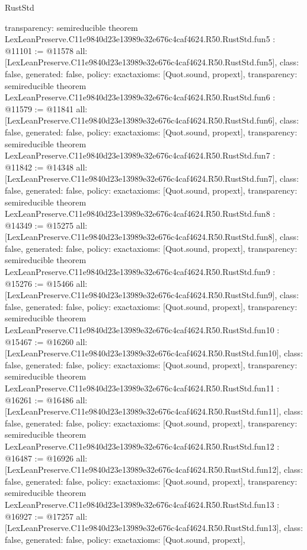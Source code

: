 \begin{lexlean}{RustStd}
\begin{coremodule}
{  transparency: semireducible
}
theorem LexLeanPreserve.C11e9840d23e13989e32e676c4caf4624.R50.RustStd.fun5 : @11101 := @11578 {
  all: [LexLeanPreserve.C11e9840d23e13989e32e676c4caf4624.R50.RustStd.fun5],
  class: false,
  generated: false,
  policy: exact{axioms: [Quot.sound, propext]},
  transparency: semireducible
}
theorem LexLeanPreserve.C11e9840d23e13989e32e676c4caf4624.R50.RustStd.fun6 : @11579 := @11841 {
  all: [LexLeanPreserve.C11e9840d23e13989e32e676c4caf4624.R50.RustStd.fun6],
  class: false,
  generated: false,
  policy: exact{axioms: [Quot.sound, propext]},
  transparency: semireducible
}
theorem LexLeanPreserve.C11e9840d23e13989e32e676c4caf4624.R50.RustStd.fun7 : @11842 := @14348 {
  all: [LexLeanPreserve.C11e9840d23e13989e32e676c4caf4624.R50.RustStd.fun7],
  class: false,
  generated: false,
  policy: exact{axioms: [Quot.sound, propext]},
  transparency: semireducible
}
theorem LexLeanPreserve.C11e9840d23e13989e32e676c4caf4624.R50.RustStd.fun8 : @14349 := @15275 {
  all: [LexLeanPreserve.C11e9840d23e13989e32e676c4caf4624.R50.RustStd.fun8],
  class: false,
  generated: false,
  policy: exact{axioms: [Quot.sound, propext]},
  transparency: semireducible
}
theorem LexLeanPreserve.C11e9840d23e13989e32e676c4caf4624.R50.RustStd.fun9 : @15276 := @15466 {
  all: [LexLeanPreserve.C11e9840d23e13989e32e676c4caf4624.R50.RustStd.fun9],
  class: false,
  generated: false,
  policy: exact{axioms: [Quot.sound, propext]},
  transparency: semireducible
}
theorem LexLeanPreserve.C11e9840d23e13989e32e676c4caf4624.R50.RustStd.fun10 : @15467 := @16260 {
  all: [LexLeanPreserve.C11e9840d23e13989e32e676c4caf4624.R50.RustStd.fun10],
  class: false,
  generated: false,
  policy: exact{axioms: [Quot.sound, propext]},
  transparency: semireducible
}
theorem LexLeanPreserve.C11e9840d23e13989e32e676c4caf4624.R50.RustStd.fun11 : @16261 := @16486 {
  all: [LexLeanPreserve.C11e9840d23e13989e32e676c4caf4624.R50.RustStd.fun11],
  class: false,
  generated: false,
  policy: exact{axioms: [Quot.sound, propext]},
  transparency: semireducible
}
theorem LexLeanPreserve.C11e9840d23e13989e32e676c4caf4624.R50.RustStd.fun12 : @16487 := @16926 {
  all: [LexLeanPreserve.C11e9840d23e13989e32e676c4caf4624.R50.RustStd.fun12],
  class: false,
  generated: false,
  policy: exact{axioms: [Quot.sound, propext]},
  transparency: semireducible
}
theorem LexLeanPreserve.C11e9840d23e13989e32e676c4caf4624.R50.RustStd.fun13 : @16927 := @17257 {
  all: [LexLeanPreserve.C11e9840d23e13989e32e676c4caf4624.R50.RustStd.fun13],
  class: false,
  generated: false,
  policy: exact{axioms: [Quot.sound, propext]},
}
\end{coremodule}
\end{lexlean}
